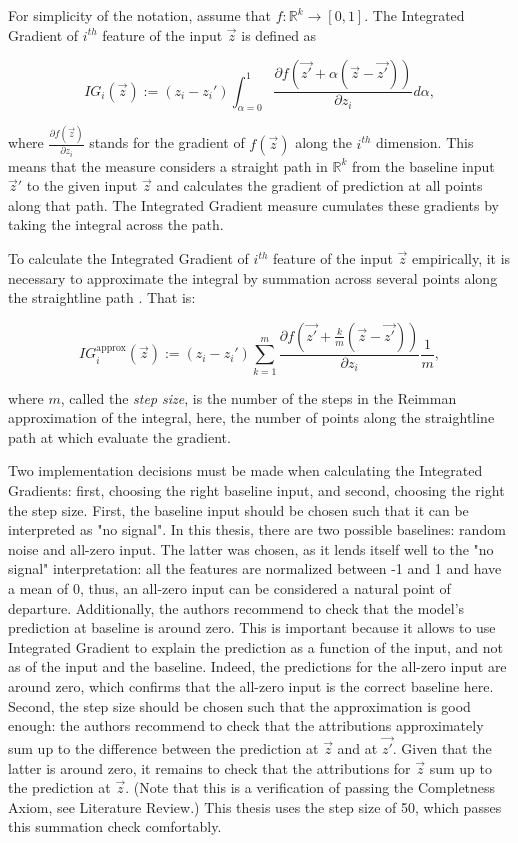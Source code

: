 			For simplicity of the notation, assume that $f: \mathbb{R}^k \rightarrow [0,1]$. The Integrated Gradient of $i^{th}$ feature of the input $\vec{z}$ is defined as 
			
			\begin{equation*}
				IG_i(\vec{z}) := (z_i - z_i') \int_{\alpha=0}^{1} \frac{\partial f(\vec{z'} + \alpha(\vec{z}-\vec{z'}))}{\partial z_i}d\alpha,
			\end{equation*}
			
			where $\frac{\partial f(\vec{z})}{\partial z_i}$ stands for the gradient of $f(\vec{z})$ along the $i^{th}$ dimension. This means that the measure considers a straight path in $\mathbb{R}^k$ from the baseline input ${\vec{z}'}$ to the given input ${\vec{z}}$ and calculates the gradient of prediction at all points along that path. The Integrated Gradient measure cumulates these gradients by taking the integral across the path.  
			
			To calculate the Integrated Gradient of $i^{th}$ feature of the input $\vec{z}$ empirically, it is necessary to approximate the integral by summation across several points along the straightline path  \citep{sundararajan2017axiomatic}. That is:  
			
			\begin{equation*}
				IG_i^{\text{approx}}(\vec{z}) := (z_i - z_i') \sum_{k=1}^{m} \frac{\partial f(\vec{z'} + \frac{k}{m}(\vec{z}-\vec{z'}))}{\partial z_i}\frac{1}{m},
			\end{equation*} 
	
			where $m$, called the \textit{step size}, is the number of the steps in the Reimman approximation of the integral, here, the number of points along the straightline path at which evaluate the gradient. 
			
			Two implementation decisions must be made when calculating the Integrated Gradients: first, choosing the right baseline input, and second, choosing the right the step size. First, the baseline input should be chosen such that it can be interpreted as "no signal". In this thesis, there are two possible baselines: random noise and all-zero input. The latter was chosen, as it lends itself well to the "no signal" interpretation: all the features are normalized between -1 and 1 and have a mean of 0, thus, an all-zero input can be considered a natural point of departure. Additionally, the authors recommend to check that the model's prediction at baseline is around zero. This is important because it allows to use Integrated Gradient to explain the prediction as a function of the input, and not as of the input and the baseline. Indeed, the predictions for the all-zero input are around zero, which confirms that the all-zero input is the correct baseline here. Second, the step size should be chosen such that the approximation is good enough: the authors recommend to check that the attributions approximately sum up to the difference between the prediction at $\vec{z}$ and at $\vec{z'}$. Given that the latter is around zero, it remains to check that the attributions for $\vec{z}$ sum up to the prediction at $\vec{z}$. (Note that this is a verification of passing the Completness Axiom, see Literature Review.) This thesis uses the step size of 50, which passes this summation check comfortably.  
		
